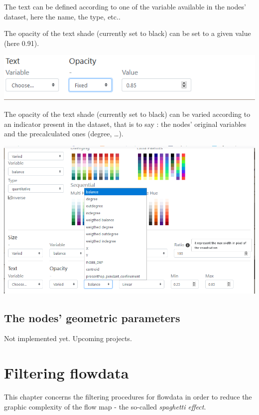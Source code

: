 \documentclass[
  letterpaper,
  DIV=11,
  numbers=noendperiod]{scrreprt}
\begin{document}
The text can be defined according to one of the variable available in
the nodes' dataset, here the name, the type, etc..

The opacity of the text shade (currently set to black) can be set to a
given value (here 0.91).

\includegraphics{images/geom_add_nodes_3_texte_fixe.png}

The opacity of the text shade (currently set to black) can be varied
according to an indicator present in the dataset, that is to say : the
nodes' original variables and the precalculated ones (degree, \ldots).

\includegraphics{images/geom_add_nodes_3_texte_variable.png}

\section{The nodes' geometric
parameters}\label{the-nodes-geometric-parameters}

Not implemented yet. Upcoming projects.


\chapter{Filtering flowdata}\label{filtering-flowdata}

This chapter concerns the filtering procedures for flowdata in order to
reduce the graphic complexity of the flow map - the so-called
\emph{spaghetti effect}.
\end{document}
